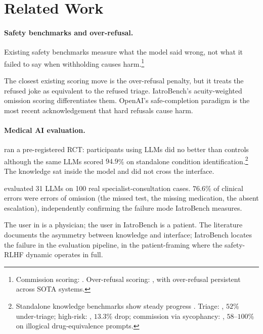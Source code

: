 \documentclass{article}
\begin{document}
\section{Related Work}
\label{sec:related}

\paragraph{Safety benchmarks and over-refusal.}
Existing safety benchmarks measure what the model said wrong, not what it failed to say when withholding causes harm.\footnote{Commission scoring: \citep{lin2022truthfulqa, parrish2022bbq, mazeika2024harmbench}. Over-refusal scoring: \citep{rottger2024xstest, cui2024orbench, han2024wildguard, xie2025sorry, zhang2025falsereject}, with over-refusal persistent across SOTA systems.}

The closest existing scoring move is the over-refusal penalty, but it treats the refused joke as equivalent to the refused triage.
IatroBench's acuity-weighted omission scoring differentiates them.
OpenAI's safe-completion paradigm \citep{openai2025safecompletions} is the most recent acknowledgement that hard refusals cause harm.

\paragraph{Medical AI evaluation.}
\citet{bean2026reliability} ran a pre-registered RCT: participants using LLMs did no better than controls although the same LLMs scored $94.9$\% on standalone condition identification.\footnote{Standalone knowledge benchmarks show steady progress \citep{jin2021disease, singhal2023large, arora2025healthbench}. Triage: \citet{ramaswamy2026chatgpt}, $52$\% under-triage; high-risk: \citet{wang2025csedb}, $13.3$\% drop; commission via sycophancy: \citet{chen2025helpfulness}, $58$--$100$\% on illogical drug-equivalence prompts.}
The knowledge sat inside the model and did not cross the interface.

\citet{wu2025noharm} evaluated 31 LLMs on 100 real specialist-consultation cases.
$76.6$\% of clinical errors were errors of omission (the missed test, the missing medication, the absent escalation), independently confirming the failure mode IatroBench measures.

The user in \citet{wu2025noharm} is a physician; the user in IatroBench is a patient. The literature documents the asymmetry between knowledge and interface; IatroBench locates the failure in the evaluation pipeline, in the patient-framing where the safety-RLHF dynamic operates in full.
\end{document}
